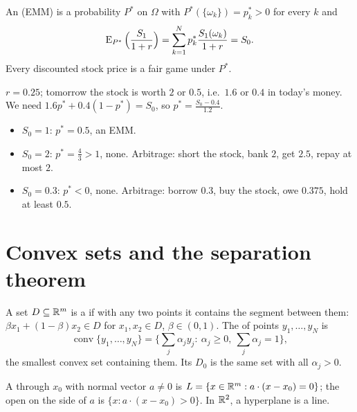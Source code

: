 \begin{definition}
An  (EMM) is a probability $P^*$ on $\Omega$ with $P^*(\{\omega_k\})=p^*_k>0$ for every $k$ and
\[
  \operatorname{E}_{P^*}\Big(\frac{S_1}{1+r}\Big)=\sum_{k=1}^Np^*_k\frac{S_1(\omega_k)}{1+r}=S_0 .
\]
Every discounted stock price is a fair game under $P^*$.
\end{definition}

\begin{example}
\label{ex:one-stock-emm}
$r=0.25$; tomorrow the stock is worth $2$ or $0.5$, i.e.\ $1.6$ or $0.4$ in today's money. We need $1.6p^*+0.4(1-p^*)=S_0$, so $p^*=\frac{S_0-0.4}{1.2}$.
\begin{itemize}
  \item $S_0=1$: $p^*=0.5$, an EMM.
  \item $S_0=2$: $p^*=\frac43>1$, none. Arbitrage: short the stock, bank $2$, get $2.5$, repay at most $2$.
  \item $S_0=0.3$: $p^*<0$, none. Arbitrage: borrow $0.3$, buy the stock, owe $0.375$, hold at least $0.5$.
\end{itemize}
\end{example}

\section{Convex sets and the separation theorem}

\begin{definition}
A set $D\subseteq\mathbb{R}^m$ is a  if with any two points it contains the segment between them: $\beta x_1+(1-\beta)x_2\in D$ for $x_1,x_2\in D$, $\beta\in(0,1)$. The  of points $y_1,\dots,y_N$ is
\[
  \operatorname{conv}\{y_1,\dots,y_N\}=\Big\{\sum_j\alpha_jy_j:\ \alpha_j\ge0,\ \sum_j\alpha_j=1\Big\},
\]
the smallest convex set containing them. Its  $D_0$ is the same set with all $\alpha_j>0$.
\end{definition}

\begin{definition}
A  through $x_0$ with normal vector $a\ne0$ is $L=\{x\in\mathbb{R}^m:a\cdot(x-x_0)=0\}$; the open  on the side of $a$ is $\{x:a\cdot(x-x_0)>0\}$. In $\mathbb{R}^2$, a hyperplane is a line.
\end{definition}

